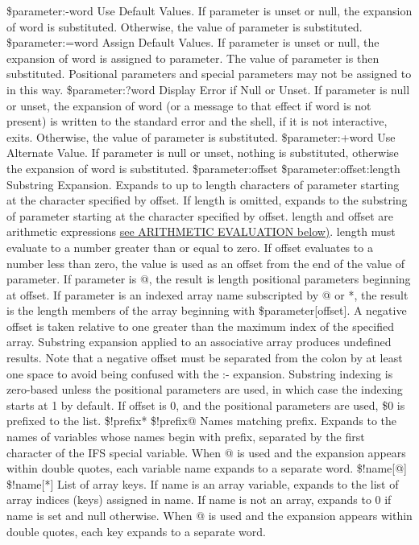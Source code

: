 \${parameter:-word}
Use Default Values. If parameter is unset or null, the expansion of word is substituted. Otherwise, the value of parameter is substituted.
\${parameter:=word}
Assign Default Values. If parameter is unset or null, the expansion of word is assigned to parameter. The value of parameter is then substituted. Positional parameters and special parameters may not be assigned to in this way.
\${parameter:?word}
Display Error if Null or Unset. If parameter is null or unset, the expansion of word (or a message to that effect if word is not present) is written to the standard error and the shell, if it is not interactive, exits. Otherwise, the value of parameter is substituted.
\${parameter:+word}
Use Alternate Value. If parameter is null or unset, nothing is substituted, otherwise the expansion of word is substituted.
\${parameter:offset}
\${parameter:offset:length}
Substring Expansion. Expands to up to length characters of parameter starting at the character specified by offset. If length is omitted, expands to the substring of parameter starting at the character specified by offset. length and offset are arithmetic expressions \hyperref[sec:arithmeticevaluation]{see ARITHMETIC EVALUATION below)}. length must evaluate to a number greater than or equal to zero. If offset evaluates to a number less than zero, the value is used as an offset from the end of the value of parameter. If parameter is @, the result is length positional parameters beginning at offset. If parameter is an indexed array name subscripted by @ or *, the result is the length members of the array beginning with \${parameter[offset]}. A negative offset is taken relative to one greater than the maximum index of the specified array. Substring expansion applied to an associative array produces undefined results. Note that a negative offset must be separated from the colon by at least one space to avoid being confused with the :- expansion. Substring indexing is zero-based unless the positional parameters are used, in which case the indexing starts at 1 by default. If offset is 0, and the positional parameters are used, \$0 is prefixed to the list.
\${!prefix*}
\${!prefix@}
Names matching prefix. Expands to the names of variables whose names begin with prefix, separated by the first character of the IFS special variable. When @ is used and the expansion appears within double quotes, each variable name expands to a separate word.
\${!name[@]}
\${!name[*]}
List of array keys. If name is an array variable, expands to the list of array indices (keys) assigned in name. If name is not an array, expands to 0 if name is set and null otherwise. When @ is used and the expansion appears within double quotes, each key expands to a separate word.
